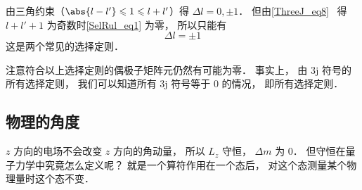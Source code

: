 由三角约束（$\abs{l-l'} \leqslant 1 \leqslant l + l'$）得 $\Delta l = 0, \pm 1$． 但由\autoref{ThreeJ_eq8}~ 得 $l + l' + 1$ 为奇数时\autoref{SelRul_eq1} 为零， 所以只能有
\begin{equation}
 \Delta l = \pm 1
\end{equation}
这是两个常见的选择定则．

注意符合以上选择定则的偶极子矩阵元仍然有可能为零． 事实上， 由 3j 符号的所有选择定则， 我们可以知道所有 3j 符号等于 0 的情况， 即所有选择定则．

\subsection{物理的角度}
$z$ 方向的电场不会改变 $z$ 方向的角动量， 所以 $L_z$ 守恒， $\Delta m$ 为 0． 但守恒在量子力学中究竟怎么定义呢？ 就是一个算符作用在一个态后， 对这个态测量某个物理量时这个态不变．


